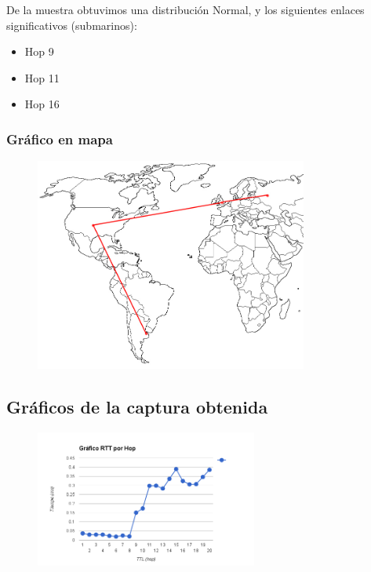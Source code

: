 De la muestra obtuvimos una distribuci\'on Normal, y los siguientes enlaces significativos (submarinos):
\begin{itemize}
\item Hop 9
\item Hop 11
\item Hop 16
\end{itemize}

\subsubsection{Gr\'afico en mapa}

\begin{figure}[h]
    \includegraphics[width=0.8\textwidth]{img_analisis1/mapa.jpg}
    
\end{figure}
\vspace{0.25cm}

\subsection{Gr\'aficos de la captura obtenida}

\begin{figure}[h]
    \includegraphics[width=0.65\textwidth]{img_analisis1/rtt_hop.png}
    
\end{figure}
\vspace{0.25cm}

